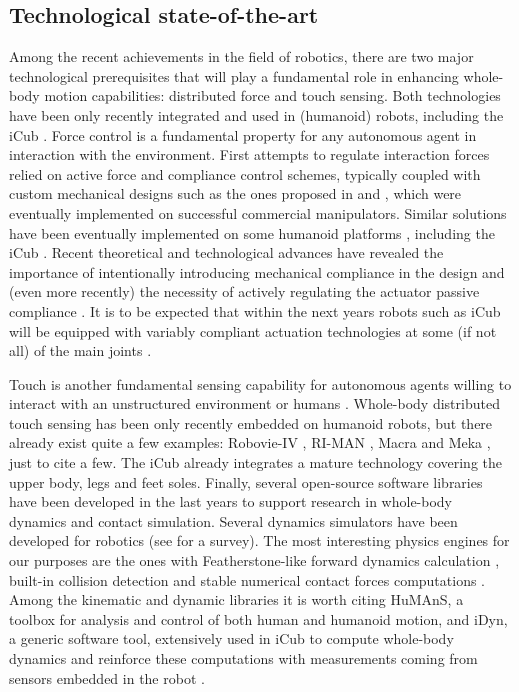 \documentclass[final,5p,twocolumn]{elsarticle}
\begin{document}
\subsection{Technological state-of-the-art}
Among the recent achievements in the field of robotics, there are two major technological prerequisites that will play a fundamental role in enhancing whole-body motion capabilities: distributed force and touch sensing. Both technologies have been only recently integrated and used in (humanoid) robots, including the iCub \cite{MettaG._etal2010}.
Force control is a fundamental property for any autonomous agent in interaction with the environment. First attempts to regulate interaction forces relied on active force and compliance control schemes, typically coupled with custom mechanical designs such as the ones proposed in \cite{Salisbury1988} and \cite{Hayashi2007}, which were eventually implemented on successful commercial manipulators. Similar solutions have been eventually implemented on some humanoid platforms \cite{Cheng2006} \cite{Escande2010}, including the iCub \cite{Fumagalli2012}. Recent theoretical and technological advances have revealed the importance of intentionally introducing mechanical compliance in the design \cite{Pratt1995} and (even more recently) the necessity of actively regulating the actuator passive compliance \cite{Koganezawa2005} \cite{Tonietti2005} \cite{Migliore2005}. It is to be expected that within the next years robots such as iCub will be equipped with variably compliant actuation technologies at some (if not all) of the main joints \cite{Tsagarakis2009} \cite{Tsagarakis2011}.

Touch is another fundamental sensing capability for autonomous agents willing to interact with an unstructured environment or humans \cite{Argall2010a}. Whole-body distributed touch sensing has been only recently embedded on humanoid robots, but there already exist quite a few examples: Robovie-IV \cite{Mitsunaga2006}, RI-MAN \cite{Mukai2008}, Macra \cite{Hayashi2007}  and Meka \cite{Jain}, just to cite a few. The iCub already integrates a mature technology \cite{Schmitz2011} covering the upper body, legs and feet soles. 
Finally, several open-source software libraries have been developed in the last years to support research in whole-body dynamics and contact simulation. Several dynamics simulators have been developed for robotics (see \cite{ivaldi2014} for a survey). The most interesting physics engines for our purposes are the ones with Featherstone-like forward dynamics calculation \cite{Featherstone2008} \cite{Yamane2006a}, built-in collision detection and stable numerical contact forces computations \cite{Nakaoka2007}. Among the kinematic and dynamic libraries it is worth citing HuMAnS, a toolbox for analysis and control of both human and humanoid motion, and iDyn, a generic software tool, extensively used in iCub to compute whole-body dynamics and reinforce these computations with measurements coming from sensors embedded in the robot \cite{Fumagalli2012}.
\end{document}
